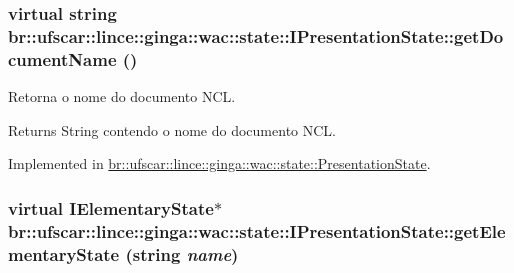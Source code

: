 \hypertarget{classbr_1_1ufscar_1_1lince_1_1ginga_1_1wac_1_1state_1_1IPresentationState_a20c06c68a1db0160932abf7d6aa4967c}{
\subsubsection[{getDocumentName}]{\setlength{\rightskip}{0pt plus 5cm}virtual string br::ufscar::lince::ginga::wac::state::IPresentationState::getDocumentName ()}}
\label{classbr_1_1ufscar_1_1lince_1_1ginga_1_1wac_1_1state_1_1IPresentationState_a20c06c68a1db0160932abf7d6aa4967c}


Retorna o nome do documento NCL. 

\begin{DoxyReturn}{Returns}
String contendo o nome do documento NCL. 
\end{DoxyReturn}


Implemented in \hyperlink{classbr_1_1ufscar_1_1lince_1_1ginga_1_1wac_1_1state_1_1PresentationState_a90a8797bdaffaed86c5a686652fea889}{br::ufscar::lince::ginga::wac::state::PresentationState}.

\hypertarget{classbr_1_1ufscar_1_1lince_1_1ginga_1_1wac_1_1state_1_1IPresentationState_a42e36ac35404e13df2b3df4f2da614a1}{
\subsubsection[{getElementaryState}]{\setlength{\rightskip}{0pt plus 5cm}virtual {\bf IElementaryState}$\ast$ br::ufscar::lince::ginga::wac::state::IPresentationState::getElementaryState (string {\em name})}}
\label{classbr_1_1ufscar_1_1lince_1_1ginga_1_1wac_1_1state_1_1IPresentationState_a42e36ac35404e13df2b3df4f2da614a1}



